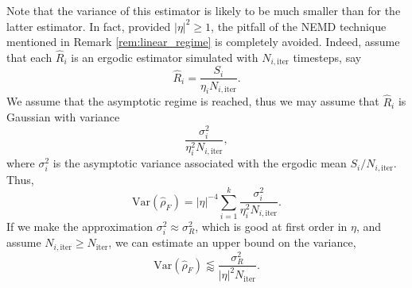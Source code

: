 Note that the variance of this estimator is likely to be much smaller than for the latter estimator. 
In fact, provided $|\eta|^2 \geq 1$, the pitfall of the NEMD technique mentioned in Remark \ref{rem:linear_regime} is completely avoided.
Indeed, assume that each $\widehat{R}_i$ is an ergodic estimator simulated with $N_{i,\mathrm{iter}}$ timesteps, say
\[\widehat{R}_i=\frac{S_i}{\eta_i N_{i,\mathrm{iter}}}.\]
We assume that the asymptotic regime is reached, thus we may assume that $\widehat{R}_i$ is Gaussian with variance $$\frac{\sigma^2_i}{\eta_i^2 N_{i,\mathrm{iter}}},$$
where $\sigma^2_i$ is the asymptotic variance associated with the ergodic mean $S_i/N_{i,\mathrm{iter}}$. Thus,
\begin{equation}
    \label{eq:var_of_lsq_fit}
    \mathrm{Var}(\widehat{\rho}_F)=|\eta|^{-4}\sum_{i=1}^k \frac{\sigma_i^2}{\eta_i^2N_{i,\mathrm{iter}}}.
\end{equation}
If we make the approximation $\sigma_i^2 \approx \sigma_R^2$, which is good at first order in $\eta$, and assume $N_{i,\mathrm{iter}}\geq N_{\mathrm{iter}}$,
we can estimate an upper bound on the variance,
\[ \mathrm{Var}(\widehat{\rho}_F) \lessapprox \frac{\sigma_R^2}{|\eta|^2N_{\mathrm{iter}}}.\]

